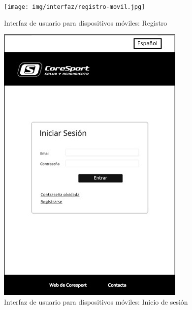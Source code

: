 \begin{figure}[h!]
\centering
  \texttt{[image: img/interfaz/registro-movil.jpg]}
  \caption{Interfaz de usuario para dispositivos móviles: Registro}
  \label{fig:interfaz-registro-movil}
\end{figure}

\begin{figure}[h!]
\centering
  \includegraphics[scale=.40]{img/interfaz/inicio-sesion-movil.jpg}
  \caption{Interfaz de usuario para dispositivos móviles: Inicio de sesión}
  \label{fig:interfaz-inicio-sesion-movil}
\end{figure}

